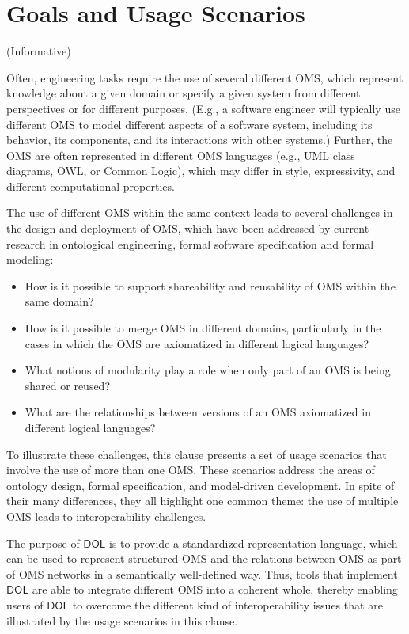 \documentclass[10pt,fleqn,final]{scrreprt}
\newcommand{\cbs}[0]{\color{red}\xspace} %
\newcommand{\cbe}[0]{\color{black}\xspace} %
\newcommand*{\DOL}{\ensuremath{\mathsf{DOL}}\xspace}
\newcommand{\informative}[0]{{\begin{center}{\Large{(Informative})}\end{center}} \bigskip}
\newcommand{\clauseI}[1]{\chapter{#1} \informative }
\newenvironment{definitions}[0]{\medskip }{}
\begin{document}
\begin{definitions}

\clauseI{Goals and Usage Scenarios} \label{c:goal}


Often, engineering tasks require the use of several different OMS, which represent knowledge about 
a given domain or specify a given system from different perspectives or for different purposes.
(E.g., a software engineer will typically use different OMS to model different aspects of a software
 system,  including its behavior, its components, and its interactions with other systems.)  Further, the OMS are often represented in different OMS languages (e.g., UML class diagrams, OWL, or Common Logic), which may differ in style, expressivity, and different computational properties. 

The use of different OMS within the same context leads to  several 
challenges in the design and deployment of OMS, which have been addressed by current research in 
ontological engineering, formal software specification and formal modeling:
\begin{itemize}
\item How\cbs is it possible\cbe to support shareability and reusability of OMS within the same domain?
\item How\cbs is it possible\cbe to merge OMS in different domains, particularly in the cases 
in which the OMS are axiomatized in different logical languages?
\item What notions of modularity play a role when only part of an OMS is being shared or reused?
\item What are the relationships between versions of an OMS axiomatized in different logical languages?
\end{itemize}


To illustrate these challenges,\cbs this clause presents\cbe a set of usage scenarios that involve the use of more than one OMS. These scenarios address the areas of ontology design, formal specification, and model-driven development. In spite of their many differences, they  all highlight one common theme:  
 the use of multiple OMS leads to interoperability challenges. 


The purpose of \DOL is to provide  a
standardized representation language, which can be used to represent structured OMS and the relations 
between OMS as part of OMS networks in a semantically well-defined way. Thus, tools that implement \DOL are able to integrate different OMS into a coherent whole, thereby enabling users of \DOL to overcome the different kind of interoperability issues that\cbs are\cbe illustrated by the usage scenarios in this clause.  


\end{definitions}
\end{document}

